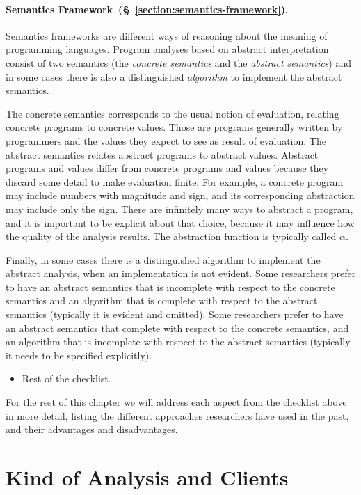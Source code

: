 \documentclass[12pt, oneside]{book}
\begin{document}
\paragraph{Semantics Framework~(§~\ref{section:semantics-framework}).}

Semantics frameworks are different ways of reasoning about the meaning of programming languages. Program analyses based on abstract interpretation consist of two semantics (the \emph{concrete semantics} and the \emph{abstract semantics}) and in some cases there is also a distinguished \emph{algorithm} to implement the abstract semantics.

The concrete semantics corresponds to the usual notion of evaluation, relating concrete programs to concrete values. Those are programs generally written by programmers and the values they expect to see as result of evaluation. The abstract semantics relates abstract programs to abstract values. Abstract programs and values differ from concrete programs and values because they discard some detail to make evaluation finite. For example, a concrete program may include numbers with magnitude and sign, and its corresponding abstraction may include only the sign. There are infinitely many ways to abstract a program, and it is important to be explicit about that choice, because it may influence how the quality of the analysis results. The abstraction function is typically called \(α\).

Finally, in some cases there is a distinguished algorithm to implement the abstract analysis, when an implementation is not evident. Some researchers prefer to have an abstract semantics that is incomplete with respect to the concrete semantics and an algorithm that is complete with respect to the abstract semantics (typically it is evident and omitted). Some researchers prefer to have an abstract semantics that complete with respect to the concrete semantics, and an algorithm that is incomplete with respect to the abstract semantics (typically it needs to be specified explicitly).

\begin{itemize}
  \item Rest of the checklist.
\end{itemize}

For the rest of this chapter we will address each aspect from the checklist above in more detail, listing the different approaches researchers have used in the past, and their advantages and disadvantages.

\section{Kind of Analysis and Clients}
\label{section:kind-of-analysis-and-clients}
\end{document}
